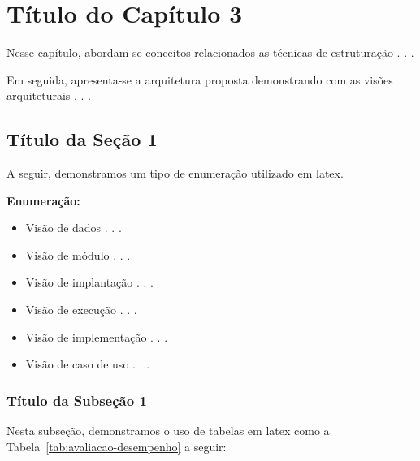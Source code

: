 \pagestyle{empty}


\pagestyle{fancy}


\chapter{Título do Capítulo 3}\label{cap3}

Nesse capítulo, abordam-se conceitos relacionados as técnicas de estruturação . . . 

Em seguida, apresenta-se a arquitetura proposta demonstrando com as visões arquiteturais . . .



\section{Título da Seção 1}\label{cap3:secao1}

A seguir, demonstramos um tipo de enumeração utilizado em latex.

\textbf{Enumeração:}

\begin{itemize}
    \item Visão de dados . . .
    \item Visão de módulo . . .
    \item Visão de implantação . . .
    \item Visão de execução  . . .
    \item Visão de implementação  . . .
    \item Visão de caso de uso . . .
 \end{itemize}
 
 
\subsection{Título da Subseção 1}\label{cap3:secao1}

Nesta subseção, demonstramos o uso de tabelas em latex como a Tabela~\ref{tab:avaliacao-desempenho} 
a seguir:

